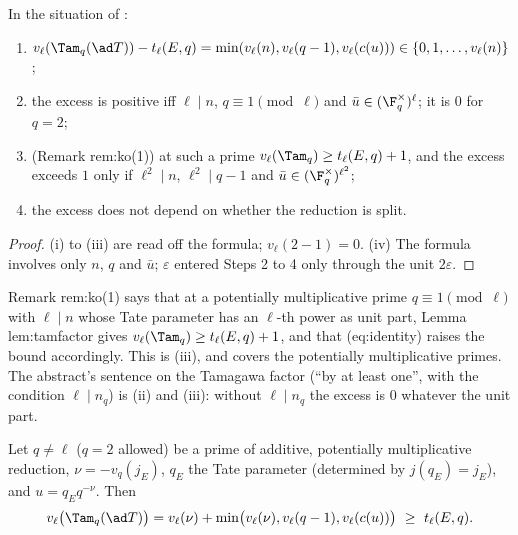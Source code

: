 \begin{corollary}[consequences]\label{cor:blochkato:tamfactor-consequences}
In the situation of :
\begin{enumerate}[label=(\roman*)]
\item $v_\ell(\Tam_q(\ad T))-t_\ell(E,q)=\min(v_\ell(n),v_\ell(q-1),v_\ell(c(u)))\in\{0,1,\dots,v_\ell(n)\}$;
\item the excess is positive iff $\ell\mid n$, $q\equiv1\pmod\ell$ and $\bar u\in(\F_q^\times)^\ell$; it is $0$ for $q=2$;
\item (Remark rem:ko(1)) at such a prime $v_\ell(\Tam_q)\ge t_\ell(E,q)+1$, and the excess exceeds $1$ only if $\ell^2\mid n$, $\ell^2\mid q-1$ and $\bar u\in(\F_q^\times)^{\ell^2}$;
\item the excess does not depend on whether the reduction is split.
\end{enumerate}
\end{corollary}

\begin{proof}
(i) to (iii) are read off the formula; $v_\ell(2-1)=0$. (iv) The formula involves only $n$, $q$ and $\bar u$; $\varepsilon$ entered Steps 2 to 4 only through the unit $2\varepsilon$.
\end{proof}

\begin{paperlink}
Remark rem:ko(1) says that at a potentially multiplicative prime $q\equiv1\pmod\ell$ with $\ell\mid n$ whose Tate parameter has an $\ell$-th power as unit part,
Lemma lem:tamfactor gives $v_\ell(\Tam_q)\ge t_\ell(E,q)+1$, and that (eq:identity) raises the bound accordingly. This is (iii), and  covers the potentially
multiplicative primes. The abstract's sentence on the Tamagawa factor (``by at least one'', with the condition $\ell\mid n_q$) is (ii) and (iii): without
$\ell\mid n_q$ the excess is $0$ whatever the unit part.
\end{paperlink}

\begin{proposition}\label{prop:blochkato:tam-potmult}
Let $q\ne\ell$ ($q=2$ allowed) be a prime of additive, potentially multiplicative reduction, $\nu=-v_q(j_E)$, $q_E$ the Tate parameter (determined by $j(q_E)=j_E$), and
$u=q_Eq^{-\nu}$. Then
\[
v_\ell\bigl(\Tam_q(\ad T)\bigr)=v_\ell(\nu)+\min\bigl(v_\ell(\nu),v_\ell(q-1),v_\ell(c(u))\bigr)\ \ge\ t_\ell(E,q).
\]
\end{proposition}

